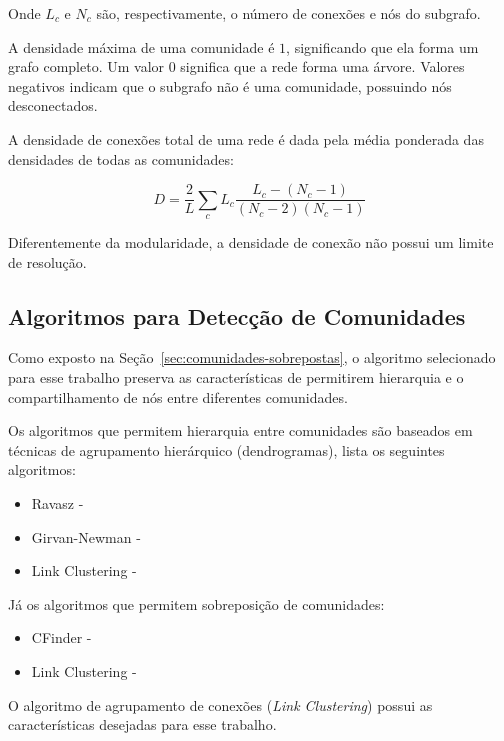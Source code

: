 \documentclass[
  article,
  11pt,
  a4paper,
  english,
  brazil,
  sumario=tradicional]{abntex2}
\begin{document}
Onde $L_c$ e $N_c$ são, respectivamente, o número de conexões e nós do subgrafo.

A densidade máxima de uma comunidade é $1$, significando que ela forma um grafo completo. Um valor $0$ significa que a rede forma uma árvore. Valores negativos indicam que o subgrafo não é uma comunidade, possuindo nós desconectados.

A densidade de conexões total de uma rede é dada pela média ponderada das densidades de todas as comunidades:

\begin{equation} \label{eq:densidade-de-conexoes}
D = \frac{2}{L} \sum_c L_c \frac{L_c - (N_c - 1)}{(N_c - 2) (N_c - 1)}
\end{equation}

Diferentemente da modularidade, a densidade de conexão não possui um limite de resolução.

\subsection{Algoritmos para Detecção de Comunidades}

Como exposto na Seção~\ref{sec:comunidades-sobrepostas}, o algoritmo selecionado para esse trabalho preserva as características de permitirem hierarquia e o compartilhamento de nós entre diferentes comunidades.

Os algoritmos que permitem hierarquia entre comunidades são baseados em técnicas de agrupamento hierárquico (dendrogramas),  lista os seguintes algoritmos:

\begin{itemize}
  \item Ravasz - 
  \item Girvan-Newman - 
  \item Link Clustering - 
\end{itemize}

Já os algoritmos que permitem sobreposição de comunidades:

\begin{itemize}
  \item CFinder - 
  \item Link Clustering - 
\end{itemize}

O algoritmo de agrupamento de conexões (\textit{Link Clustering}) possui as características desejadas para esse trabalho.
\end{document}
